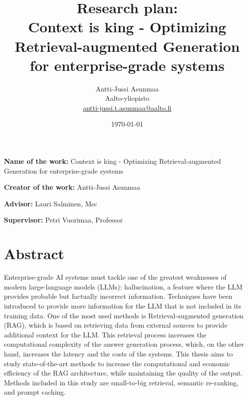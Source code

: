 \documentclass[12pt,a4paper,english,oneside]{article}
\begin{document}

\title{Research plan:\\[5mm]
Context is king - Optimizing Retrieval-augmented Generation for enterprise-grade systems}

\author{Antti-Jussi Asunmaa\\
Aalto-yliopisto\\
\url{antti-jussi.t.asunmaa@aalto.fi}}

\date{\today}

\maketitle


\vspace{10mm}

%

\textbf{Name of the work:} Context is king - Optimizing Retrieval-augmented Generation for enterprise-grade systems

\textbf{Creator of the work:} Antti-Jussi Asunmaa

\textbf{Advisor:} Lauri Salminen, Msc

\textbf{Supervisor:} Petri Vuorimaa, Professor


\section{Abstract}

Enterprise-grade AI systems must tackle one of the greatest weaknesses of modern large-language models (LLMs): hallucination, a feature where the LLM provides probable but factually incorrect information. Techniques have been introduced to provide more information for the LLM that is not included in its training data. One of the most used methods is Retrieval-augmented generation (RAG), which is based on retrieving data from external sources to provide additional context for the LLM. This retrieval process increases the computational complexity of the answer generation process, which, on the other hand, increases the latency and the costs of the systems. This thesis aims to study state-of-the-art methods to increase the computational and economic efficiency of the RAG architecture, while maintaining the quality of the output. Methods included in this study are small-to-big retrieval, semantic re-ranking, and prompt caching.
\end{document}
